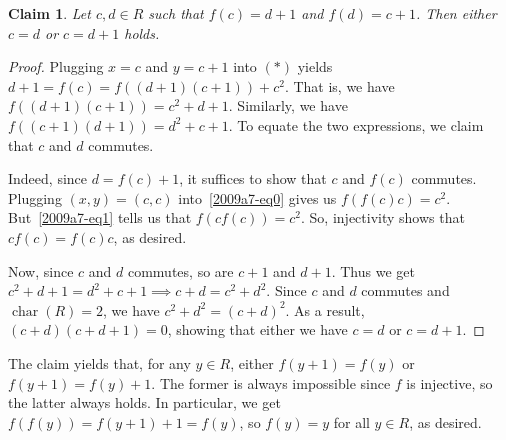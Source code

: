\documentclass{article}
\DeclareMathOperator{\rchar}{char}
\newtheorem*{claim}{Claim}
\begin{document}
\begin{claim}
Let $c, d \in R$ such that $f(c) = d + 1$ and $f(d) = c + 1$.
Then either $c = d$ or $c = d + 1$ holds.
\end{claim}
\begin{proof}
Plugging $x = c$ and $y = c + 1$ into $(*)$ yields $d + 1 = f(c) = f((d + 1)(c + 1)) + c^2$.
That is, we have $f((d + 1)(c + 1)) = c^2 + d + 1$.
Similarly, we have $f((c + 1)(d + 1)) = d^2 + c + 1$.
To equate the two expressions, we claim that $c$ and $d$ commutes.

Indeed, since $d = f(c) + 1$, it suffices to show that $c$ and $f(c)$ commutes.
Plugging $(x, y) = (c, c)$ into~\eqref{2009a7-eq0} gives us $f(f(c) c) = c^2$.
But~\eqref{2009a7-eq1} tells us that $f(c f(c)) = c^2$.
So, injectivity shows that $c f(c) = f(c) c$, as desired.

Now, since $c$ and $d$ commutes, so are $c + 1$ and $d + 1$.
Thus we get $c^2 + d + 1 = d^2 + c + 1 \implies c + d = c^2 + d^2$.
Since $c$ and $d$ commutes and $\rchar(R) = 2$, we have $c^2 + d^2 = (c + d)^2$.
As a result, $(c + d)(c + d + 1) = 0$, showing that either we have $c = d$ or $c = d + 1$.
\end{proof}

The claim yields that, for any $y \in R$, either $f(y + 1) = f(y)$ or $f(y + 1) = f(y) + 1$.
The former is always impossible since $f$ is injective, so the latter always holds.
In particular, we get $f(f(y)) = f(y + 1) + 1 = f(y)$, so $f(y) = y$ for all $y \in R$, as desired.
\end{document}
